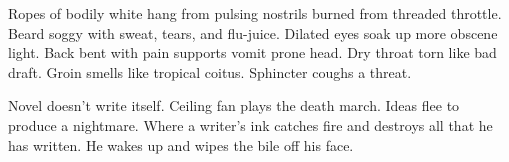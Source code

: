 \documentclass{article}
\begin{document}
\newline

Ropes of bodily white hang from pulsing nostrils burned from threaded
throttle. Beard soggy with sweat, tears, and flu-juice. Dilated eyes
soak up more obscene light. Back bent with pain supports vomit prone
head. Dry throat torn like bad draft. Groin smells like tropical coitus.
Sphincter coughs a threat.

\newline

Novel doesn't write itself. Ceiling fan plays the death march. Ideas
flee to produce a nightmare. Where a writer's ink catches fire and
destroys all that he has written. He wakes up and wipes the bile off his
face.
\end{document}
